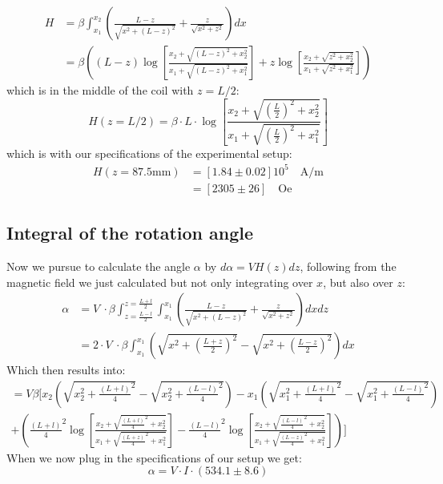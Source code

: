 \begin{align}
    H &= \beta  \int^{x_2}_{x_1} \left (  \frac{L - z}{\sqrt{x^2 + (L-z)^2}} +
      \frac{z}{\sqrt{x^2 + z^2}}    \right ) dx  \\
  &= \beta  \left (
  (L-z) \log{\left [ \frac{x_2 + \sqrt{(L-z)^2 + x_2^2}} { x_1 + \sqrt{(L-z)^2 + x_1^2}} \right]}
  +z \log{\left [ \frac{x_2 + \sqrt{z^2 + x_2^2}} { x_1 + \sqrt{z^2 + x_1^2}} \right]}
  \right)
\end{align}
which is in the middle of the coil with $z = L/2$:
\begin{equation}
    H(z = L/2) = \beta \cdot L \cdot
    \log{\left [ \frac{x_2 + \sqrt{(\frac{L}{2})^2+ x_2^2}} { x_1 + \sqrt{(\frac{L}{2})^2 + x_1^2}} \right]}
\end{equation}
which is with our specifications of the experimental setup:
\begin{align}
    H( z = 87.5 \mathrm{mm}) &=   \left [ 1.84 \pm 0.02\right ] 10^5\quad  \mathrm{A/m} \\
         &=  \left [ 2305 \pm 26\right ] \quad \mathrm{Oe}
\end{align}
\subsection{Integral of the rotation angle}
Now we pursue to calculate the angle $\alpha$ by $d\alpha = V H(z) dz$,
following from the magnetic field we just calculated but not only integrating over $x$, but
also over $z$:
\begin{align}
    \alpha &= V\ \cdot\beta  \int^{z=\frac{L+l}{2}}_{z=\frac{L-l}{2}} \int^{x_1}_{x_1}
    \left (  \frac{L - z}{\sqrt{x^2 + (L-z)^2}} +
      \frac{z}{\sqrt{x^2 + z^2}}    \right ) dx dz \\
  &=  2 \cdot V\ \cdot\beta  \int^{x_1}_{x_1}
    \left (  
        \sqrt{x^2 + \left (\frac{L+z}{2}\right )^2} -\sqrt{x^2 + \left (\frac{L-z}{2}\right )^2}
        \right ) dx  
    \end{align}
Which then results into:
\begin{equation}\label{e:barwq}\begin{split}
=   V\beta \bigl [
     x_2 \left (\sqrt{ x_2^2 + \frac{(L+l)}{4}^2}- \sqrt{ x_2^2 + \frac{(L-l)}{4}^2}\right ) 
     -x_1 \left (\sqrt{ x_1^2 + \frac{(L+l)}{4}^2}- \sqrt{ x_1^2 + \frac{(L-l)}{4}^2}\right )  \\
    +\left (
    \frac{(L+l)}{4}^2 \log{
        \left [ \frac{x_2 + \sqrt{\frac{(L+l)}{4}^2  + x_2^2}} { x_1 + \sqrt{\frac{(L+z)}{4}^2 + x_1^2}} \right]}
- \frac{(L-l)}{4}^2 \log{
        \left [ \frac{x_2 + \sqrt{\frac{(L-l)}{4}^2  + x_2^2}} { x_1 + \sqrt{\frac{(L-z)}{4}^2 + x_1^2}} \right]}
  \right)
    \bigr ]
\end{split}\end{equation}
When we now plug in the specifications of our setup we get:
\begin{equation}
    \alpha = V \cdot I \cdot \left (534.1 \pm 8.6 \right )
\end{equation}

